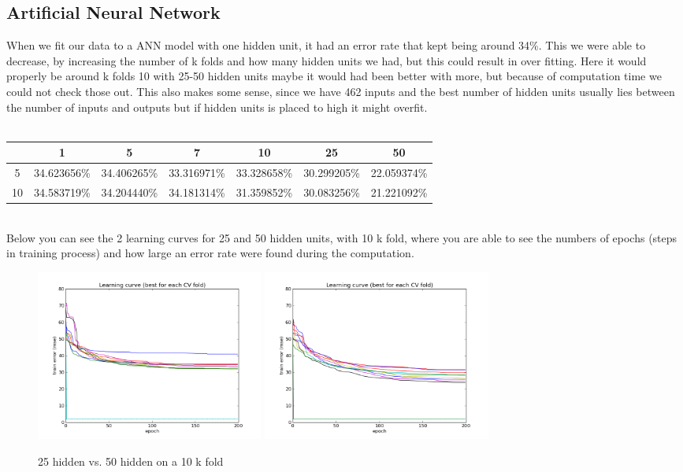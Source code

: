 \subsection{Artificial Neural Network}

When we fit our data to a ANN model with one hidden unit, it had an error rate that kept being around 34\%. This we were able to decrease, by increasing the number of k folds and how many hidden units we had, but this could result in over fitting. Here it would properly be around k folds 10 with 25-50 hidden units maybe it would had been better with more, but because of computation time we could not check those out. This also makes some sense, since we have 462 inputs and the best number of hidden units usually lies between the number of inputs and outputs but if hidden units is placed to high it might overfit.
\\\\
\begin{table}
\begin{longtable}{ccccccc}
\hline 
   & 1 			 & 5 		   & 7 			 & 10		   & 25			 & 50 \\ \hline
5  & 34.623656\% & 34.406265\% & 33.316971\% & 33.328658\% & 30.299205\% & 22.059374\% \\ 
10 & 34.583719\% & 34.204440\% & 34.181314\% & 31.359852\% & 30.083256\% & 21.221092\% \\ \hline 
\end{longtable}
\end{table}
\\
Below you can see the 2 learning curves for 25 and 50 hidden units, with 10 k fold, where you are able to see the numbers of epochs (steps in training process) and how large an error rate were found during the computation.
\begin{figure}[!h]
\centering
\includegraphics[width=7.5cm, keepaspectratio=true]{pictures/ann_1_10_25.png}
\includegraphics[width=7.5cm, keepaspectratio=true]{pictures/ann_1_10_50.png}
\vspace{-0.4cm}
\caption{\footnotesize 25 hidden vs. 50 hidden on a 10 k fold}
\label{full_10_25_50}
\end{figure}
